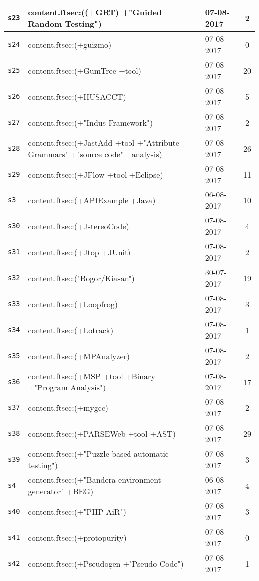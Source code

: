 \begin{longtable}{| l | p{13cm} | l | c |}
    \hline
\texttt{s23} & content.ftsec:((+GRT) +"Guided Random Testing") & 07-08-2017 & 2 \\
    \hline
\texttt{s24} & content.ftsec:(+guizmo) & 07-08-2017 & 0 \\
    \hline
\texttt{s25} & content.ftsec:(+GumTree +tool) & 07-08-2017 & 20 \\
    \hline
\texttt{s26} & content.ftsec:(+HUSACCT) & 07-08-2017 & 5 \\
    \hline
\texttt{s27} & content.ftsec:(+"Indus Framework") & 07-08-2017 & 2 \\
    \hline
\texttt{s28} & content.ftsec:(+JastAdd +tool +"Attribute Grammars" +"source code" +analysis) & 07-08-2017 & 26 \\
    \hline
\texttt{s29} & content.ftsec:(+JFlow +tool +Eclipse) & 07-08-2017 & 11 \\
    \hline
\texttt{s3} & content.ftsec:(+APIExample +Java) & 06-08-2017 & 10 \\
    \hline
\texttt{s30} & content.ftsec:(+JstereoCode) & 07-08-2017 & 4 \\
    \hline
\texttt{s31} & content.ftsec:(+Jtop +JUnit) & 07-08-2017 & 2 \\
    \hline
\texttt{s32} & content.ftsec:("Bogor/Kiasan") & 30-07-2017 & 19 \\
    \hline
\texttt{s33} & content.ftsec:(+Loopfrog) & 07-08-2017 & 3 \\
    \hline
\texttt{s34} & content.ftsec:(+Lotrack) & 07-08-2017 & 1 \\
    \hline
\texttt{s35} & content.ftsec:(+MPAnalyzer) & 07-08-2017 & 2 \\
    \hline
\texttt{s36} & content.ftsec:(+MSP +tool +Binary +"Program Analysis") & 07-08-2017 & 17 \\
    \hline
\texttt{s37} & content.ftsec:(+mygcc) & 07-08-2017 & 2 \\
    \hline
\texttt{s38} & content.ftsec:(+PARSEWeb +tool +AST) & 07-08-2017 & 29 \\
    \hline
\texttt{s39} & content.ftsec:(+"Puzzle-based automatic testing") & 07-08-2017 & 3 \\
    \hline
\texttt{s4} & content.ftsec:(+"Bandera environment generator" +BEG) & 06-08-2017 & 4 \\
    \hline
\texttt{s40} & content.ftsec:(+"PHP AiR") & 07-08-2017 & 3 \\
    \hline
\texttt{s41} & content.ftsec:(+protopurity) & 07-08-2017 & 0 \\
    \hline
\texttt{s42} & content.ftsec:(+Pseudogen +"Pseudo-Code") & 07-08-2017 & 1 \\

\end{longtable}
